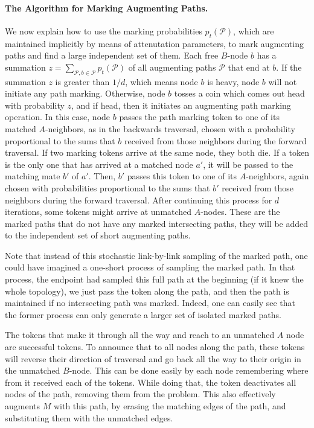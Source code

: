 \documentclass[11pt]{article}
\begin{document}
\paragraph{The Algorithm for Marking Augmenting Paths.} We now explain how to use the marking probabilities $p_{t}(\mathcal{P})$, which are maintained implicitly by means of attenutation parameters, to mark augmenting paths and find a large independent set of them. Each free $B$-node $b$ has a summation $z = \sum_{\mathcal{P}, b\in \mathcal{P}} p_{t}(\mathcal{P})$ of all augmenting paths $\mathcal{P}$ that end at $b$. If the summation $z$ is greater than $1/d$, which means node $b$ is heavy, node $b$ will not initiate any path marking. Otherwise, node $b$ tosses a coin which comes out head with probability $z$, and if head, then it initiates an augmenting path marking operation. In this case, node $b$ passes the path marking token to one of its matched $A$-neighbors, as in the backwards traversal, chosen with a probability proportional to the sums that $b$ received from those neighbors during the forward traversal. If two marking tokens arrive at the same node, they both die. If a token is the only one that has arrived at a matched node $a'$, it will be passed to the matching mate $b'$ of $a'$. Then, $b'$ passes this token to one of its $A$-neighbors, again chosen with probabilities proportional to the sums that $b'$ received from those neighbors during the forward traversal. After continuing this process for $d$ iterations, some tokens might arrive at unmatched $A$-nodes. These are the marked paths that do not have any marked intersecting paths, they will be added to the independent set of short augmenting paths.

Note that instead of this stochastic link-by-link sampling of the marked path, one could have imagined a one-short process of sampling the marked path. In that process, the endpoint had sampled this full path at the beginning (if it knew the whole topology), we just pass the token along the path, and then the path is maintained if no intersecting path was marked. Indeed, one can easily see that the former process can only generate a larger set of isolated marked paths.

The tokens that make it through all the way and reach to an unmatched $A$ node are successful tokens. To announce that to all nodes along the path, these tokens will reverse their direction of traversal and go back all the way to their origin in the unmatched $B$-node. This can be done easily by each node remembering where from it received each of the tokens. While doing that, the token deactivates all nodes of the path, removing them from the problem. This also effectively augments $M$ with this path, by erasing the matching edges of the path, and substituting them with the unmatched edges.
\end{document}
